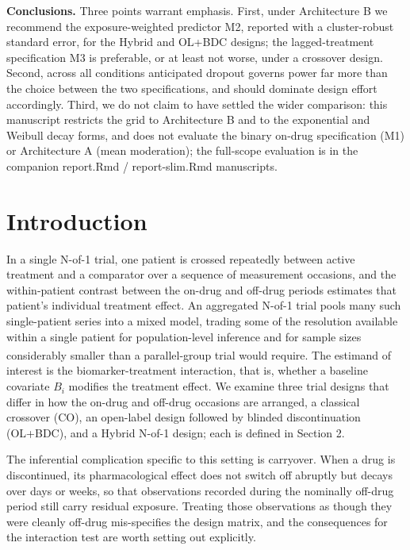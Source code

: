 \documentclass[
  11pt,
]{article}
\begin{document}
\textbf{Conclusions.} Three points warrant emphasis. First, under
Architecture B we recommend the exposure-weighted predictor M2,
reported with a cluster-robust standard error, for the Hybrid and
OL+BDC designs; the lagged-treatment specification M3 is preferable,
or at least not worse, under a crossover design. Second, across all
conditions anticipated dropout governs power far more than the choice
between the two specifications, and should dominate design effort
accordingly. Third, we do not claim to have settled the wider
comparison: this manuscript restricts the grid to Architecture B and
to the exponential and Weibull decay forms, and does not evaluate the
binary on-drug specification (M1) or Architecture A (mean
moderation); the full-scope evaluation is in the companion report.Rmd
/ report-slim.Rmd manuscripts.

\section{Introduction}\label{introduction}

In a single N-of-1 trial, one patient is crossed repeatedly between
active treatment and a comparator over a sequence of measurement
occasions, and the within-patient contrast between the on-drug and
off-drug periods estimates that patient's individual treatment
effect. An aggregated N-of-1 trial pools many such single-patient
series into a mixed model, trading some of the resolution available
within a single patient for population-level inference and for
sample sizes considerably smaller than a parallel-group trial would
require\textsuperscript{}. The estimand of interest is the
biomarker-treatment interaction, that is, whether a baseline
covariate \(B_i\) modifies the treatment effect. We examine three
trial designs that differ in how the on-drug and off-drug occasions
are arranged, a classical crossover (CO), an open-label design
followed by blinded discontinuation (OL+BDC), and a Hybrid N-of-1
design; each is defined in Section 2.

The inferential complication specific to this setting is carryover.
When a drug is discontinued, its pharmacological effect does not
switch off abruptly but decays over days or weeks, so that
observations recorded during the nominally off-drug period still
carry residual exposure. Treating those observations as though they
were cleanly off-drug mis-specifies the design matrix, and the
consequences for the interaction test are worth setting out
explicitly.
\end{document}
